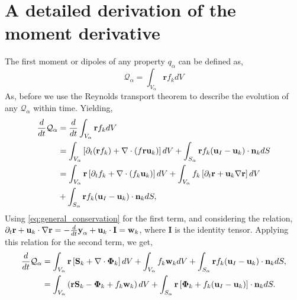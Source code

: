 \section{A detailed derivation of the moment derivative}
\label{ap:moment_derivative}
The first moment or dipoles of any property $q_\alpha$ can be defined as,
\begin{equation*}
    \mathcal{Q}_\alpha 
    = \int_{V_\alpha} \textbf{r} f_k dV
\end{equation*}
As, before we use the Reynolds transport theorem to describe the evolution of any $\mathcal{Q}_\alpha$ within time. 
Yielding,
\begin{align}
    \frac{d}{d t} \mathcal{Q}_\alpha
    & = \frac{d}{d t} \int_{V_\alpha} \textbf{r} f_k dV  \\
      &=  \int_{V_\alpha} \left[
        \partial_t(\textbf{r}  f_k)
        + \mathbf{\nabla} \cdot \left(f \textbf{r} \textbf{u}_k\right)
    \right]dV + \int_{S_\alpha} \textbf{r}  f_k  (\textbf{u}_I-\textbf{u}_k)\cdot \textbf{n}_k  dS  \nonumber \\
    &=  \int_{V_\alpha} \textbf{r}\left[
        \partial_t f_k
        + \mathbf{\nabla} \cdot \left(f_k \textbf{u}_k\right)
    \right] dV
    + \int_{V_\alpha} f_k \left[
        \partial_t \textbf{r}
        +\textbf{u}_k \mathbf{\nabla} \textbf{r}
    \right]dV\\
    &+ \int_{S_\alpha} \textbf{r}  f_k (\textbf{u}_I-\textbf{u}_k)\cdot \textbf{n}_k  dS,
\end{align}
Using \ref{eq:general_conservation}  for the first term, and considering the relation,
$  \partial_t \textbf{r}
+ \textbf{u}_k \cdot \mathbf{\nabla} \textbf{r}
= - \frac{d}{dt} \textbf{y}_\alpha  + \textbf{u}_k \cdot \textbf{I}
= \textbf{w}_k$,
where $\textbf{I}$ is the identity tensor. 
Applying this relation for the second term, we get, 
\begin{align}
    \frac{d}{d t} \mathcal{Q}_\alpha
    &= \int_{V_\alpha} \textbf{r} \left[
         \textbf{S}_k +  \mathbf{\nabla} \cdot \mathbf{\Phi}_k
    \right]dV
    +\int_{V_\alpha} f_k  \textbf{w}_k dV
    + \int_{S_\alpha} \textbf{r}  f_k (\textbf{u}_I-\textbf{u}_k)\cdot \textbf{n}_k  dS,\\
    &= \int_{V_\alpha} \left( 
        \textbf{r} \textbf{S}_k 
        - \mathbf{\Phi}_k
        + f_k  \textbf{w}_k 
    \right) dV
    + \int_{S_\alpha} \textbf{r} \left[
        \mathbf{\Phi}_k
        + f_k (\textbf{u}_I-\textbf{u}_k)
    \right]\cdot \textbf{n}_k  dS.
\end{align}

